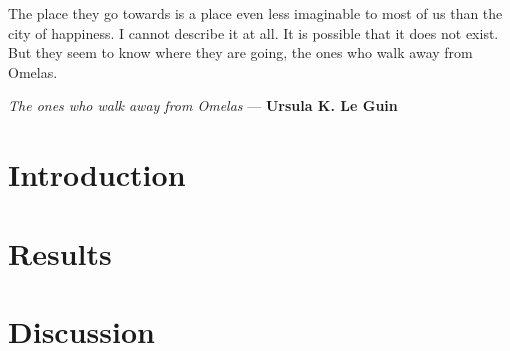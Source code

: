 




\newcommand\titledcaption[2][]{
    \ifthenelse{\isempty{#1}}
        {\caption{#2}}
        {\caption[#1]{\textbf{#1.} #2}}
}


\frontmatter {}  %
    
    \epigraph{The place they go towards is a place even less imaginable to most of us than the city of happiness. I cannot describe it at all. It is possible that it does not exist. But they seem to know where they are going, the ones who walk away from Omelas.}{\textit{The ones who walk away from Omelas} --- \textbf{Ursula K. Le Guin}}  %
    
    
    
     \tableofcontents {}

\mainmatter
    \part{Introduction}\label{introduction}
        
        
    \part{Results}\label{results}
        
        
        
    \part{Discussion}\label{discussion}
        
        

\backmatter
    \listoffigures
    \listoftables
    
    



